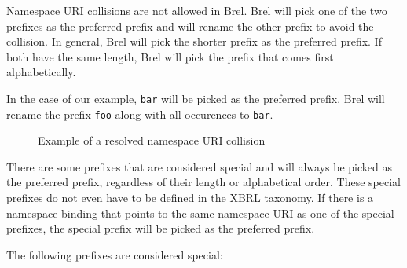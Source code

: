 Namespace URI collisions are not allowed in Brel. Brel will pick one of the two prefixes as the preferred prefix and will rename the other prefix to avoid the collision.
In general, Brel will pick the shorter prefix as the preferred prefix. If both have the same length, Brel will pick the prefix that comes first alphabetically.

In the case of our example, \texttt{bar} will be picked as the preferred prefix. 
Brel will rename the prefix \texttt{foo} along with all occurences to \texttt{bar}.

\begin{figure}[H]
    \caption{Example of a resolved namespace URI collision}
    \label{fig:namespace_uri_collision_example_renamed}
\end{figure}

There are some prefixes that are considered special and will always be picked as the preferred prefix, regardless of their length or alphabetical order.
These special prefixes do not even have to be defined in the XBRL taxonomy. 
If there is a namespace binding that points to the same namespace URI as one of the special prefixes, the special prefix will be picked as the preferred prefix.

The following prefixes are considered special:

